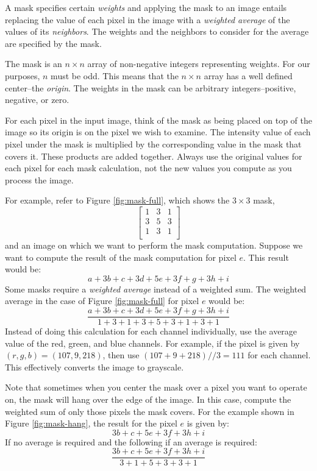 \documentclass[addpoints]{exam}
\begin{document}
A mask specifies certain \textit{weights} and applying the mask to an image entails replacing the value of each pixel in the image with a \textit{weighted average} of the values of its \textit{neighbors}. The weights and the neighbors to consider for the average are specified by the mask.

The  mask is an $n \times n$ array of non-negative integers representing weights. For our purposes, $n$ must be odd. This means that the $n \times n$ array has a well defined center--the \textit{origin}. The weights in the mask can be arbitrary integers--positive, negative, or zero.

For each pixel in the input image, think of the mask as being placed on top of the image so its origin is on the pixel we wish to examine. The intensity value of each pixel under the mask is multiplied by the corresponding value in the mask that covers it. These products are added together. Always use the original values for each pixel for each mask calculation, not the new values you compute as you process the image.

For example, refer to Figure \ref{fig:mask-full}, which shows the  $3 \times 3$ mask,
\[
  \left[
    \begin{array}{ccc}
      1 & 3 & 1\\
      3 & 5 & 3\\
      1 & 3 & 1\\
    \end{array}          
  \right]
\]
and an image on which we want to perform the mask computation. Suppose we want to compute the result of the mask computation for pixel $e$. This result would be:
\[
  a + 3b + c + 3d + 5e + 3f + g + 3h + i
\]
Some masks require a \textit{weighted average} instead of a weighted sum. The weighted average in the case of Figure \ref{fig:mask-full} for pixel $e$ would be:
\[
  \frac{a + 3b + c + 3d + 5e + 3f + g + 3h + i} {1 + 3 + 1 + 3 + 5 + 3 + 1 + 3 + 1}
\]
Instead of doing this calculation for each channel individually, use the average value of the red, green, and blue channels. For example, if the pixel is given by $(r, g, b) = (107, 9, 218)$, then use $(107 + 9 + 218)//3 = 111$ for each channel. This effectively converts the image to grayscale.

Note that sometimes when you center the mask over a pixel you want to operate on, the mask will hang over the edge of the image. In this case, compute the weighted sum of only those pixels the mask covers. For the example shown in Figure \ref{fig:mask-hang}, the result for the pixel $e$ is given by:
\[
  3b + c + 5e + 3f + 3h + i
\]
If no average is required and the following if an average is required:
\[
  \frac{3b + c + 5e + 3f + 3h + i}{3+1+5+3+3+1}
\]
\end{document}
